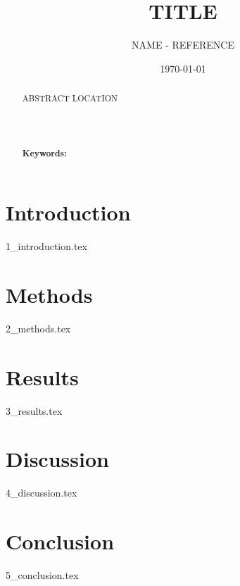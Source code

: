 \documentclass[12pt,a4paper]{article}
\title{TITLE}
\author{NAME - REFERENCE}
\date{\today}
\begin{document}
\maketitle
\begin{abstract}
\noindent
ABSTRACT LOCATION

\\
\\
\paragraph{Keywords:} 
\end{abstract}
\newpage
\section{Introduction}
{1_introduction.tex}
\section{Methods}
{2_methods.tex}
\section{Results}
{3_results.tex}
\section{Discussion}
{4_discussion.tex}
\section{Conclusion}
{5_conclusion.tex}


\end{document}
